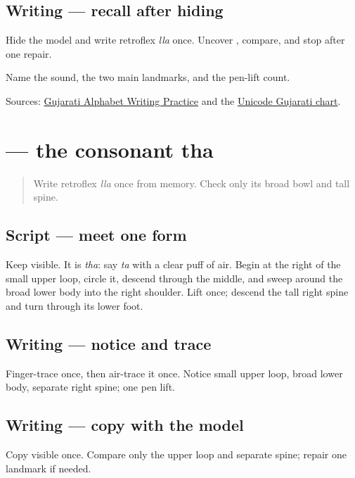 \subsection*{Writing — recall after hiding}
Hide the model and write retroflex \emph{lla} once. Uncover \textbf{}, compare, and stop after one repair.

\begin{tcolorbox}[breakable,colback=teal!4,colframe=teal!35!black,title={Before you move on}]
Name the sound, the two main landmarks, and the pen-lift count.

Sources: \href{https://www.t30apps.com/gujarati-alphabet-writing/}{Gujarati Alphabet Writing Practice} and the \href{https://www.unicode.org/charts/PDF/U0A80.pdf}{Unicode Gujarati chart}.
\end{tcolorbox}
\section[\texorpdfstring{\gu{થ} (tha)}{થ (tha)}]{ — the consonant tha}

\label{lesson:GU-W04-tha}



\begin{quote}
Write retroflex \emph{lla} once from memory. Check only its broad bowl and tall spine.
\end{quote}

\subsection*{Script — meet one form}
Keep \textbf{} visible. It is \emph{tha}: say \emph{ta} with a clear puff of air. Begin at the right of the small upper loop, circle it, descend through the middle, and sweep around the broad lower body into the right shoulder. Lift once; descend the tall right spine and turn through its lower foot.

\subsection*{Writing — notice and trace}

Finger-trace \textbf{} once, then air-trace it once. Notice small upper loop, broad lower body, separate right spine; one pen lift.

\subsection*{Writing — copy with the model}
Copy visible \textbf{} once. Compare only the upper loop and separate spine; repair one landmark if needed.

